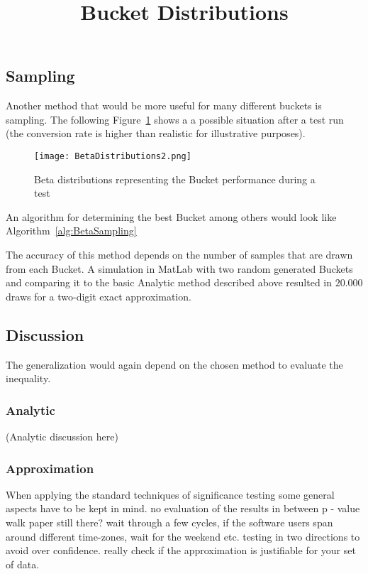\documentclass[../Thesis.tex]{subfiles}
\begin{document}
\subsection{Sampling}
Another method that would be more useful for many different buckets is sampling. The following Figure~\ref{fig:SampleBucks} shows a a possible situation after a test run (the conversion rate is higher than realistic for illustrative purposes).
\begin{figure}[h]
\centering
\texttt{[image: BetaDistributions2.png]}
\title{Bucket Distributions}
\caption[Bucket Distributions]{Beta distributions representing the Bucket performance during a test}
\label{fig:SampleBucks}
\end{figure}
An algorithm for determining the best Bucket among others would look like Algorithm~\ref{alg:BetaSampling} 
The accuracy of this method depends on the number of samples that are drawn from each Bucket. A simulation in MatLab with two random generated Buckets and comparing it to the basic Analytic method described above resulted in $20.000$ draws for a two-digit exact approximation.


\subsection{Discussion}
The generalization would again depend on the chosen method to evaluate the inequality.
\subsubsection{Analytic}
(Analytic discussion here)

\subsubsection{Approximation}
When applying the standard techniques of significance testing some general aspects have to be kept in mind.
no evaluation of the results in between p - value walk paper still there?
wait through a few cycles, if the software users span around different time-zones, wait for the weekend etc.
testing in two directions to avoid over confidence. really check if the approximation is justifiable for your set of data.
\end{document}

